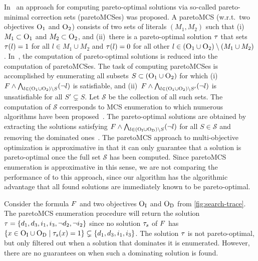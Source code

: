 In~\textcite{DBLP:conf/ijcai/Terra-NevesLM18a,DBLP:conf/aaai/Terra-NevesLM18,DBLP:conf/ijcai/Terra-NevesLM18} an approach for computing pareto-optimal solutions via so-called pareto-minimal correction sets (paretoMCSes) was proposed.
A paretoMCS (w.r.t.\ two objectives $\textsc{O}_1$ and $\textsc{O}_2$) consists of two sets of literals $(M_1, M_2)$ such that (i)~$M_1 \subset \textsc{O}_1$ and $M_2 \subset \textsc{O}_2$, and (ii)~there is a pareto-optimal solution $\tau$ that sets $\tau(l) = 1$ for all $l \in M_1 \cup M_2$ and $\tau(l) = 0$ for all other $l \in (\textsc{O}_1 \cup \textsc{O}_2) \setminus (M_1 \cup M_2)$.
In~\textcite{DBLP:conf/ijcai/Terra-NevesLM18a}, the computation of pareto-optimal solutions is reduced into the computation of paretoMCSes.
The task of computing paretoMCSes is accomplished by enumerating all subsets $S \subset  (\textsc{O}_1 \cup \textsc{O}_2)$ for which (i)~$F \land \bigwedge_{l \in  (\textsc{O}_1 \cup \textsc{O}_2) \setminus S} (\lnot l)$ is satisfiable, and (ii)~$F \land \bigwedge_{l \in  (\textsc{O}_1 \cup \textsc{O}_2) \setminus S'} (\lnot l)$ is unsatisfiable for all $S' \subsetneq S$.
Let $\mathcal{S}$ be the collection of all such sets.
The computation of $\mathcal{S}$ corresponds to MCS enumeration to which numerous algorithms have been proposed~\autocite{DBLP:conf/lpar/BendikC20,DBLP:conf/hvc/MorgadoLM12,DBLP:conf/sat/PrevitiMJM17}.
The pareto-optimal solutions are obtained by extracting the solutions satisfying $F \land \bigwedge_{l \in  (\textsc{O}_{\text{I}} \cup \textsc{O}_{\text{D}}) \setminus S} (\lnot l)$ for all $S \in \mathcal{S}$ and removing the dominated ones~\autocite{DBLP:conf/ijcai/Terra-NevesLM18a}.
The paretoMCS approach to multi-objective optimization is approximative in that it can only guarantee that a solution is pareto-optimal once the full set $\mathcal{S}$ has been computed.
Since paretoMCS enumeration is approximative in this sense, we are not comparing the performance of \algname{} to this approach, since our algorithm has the algorithmic advantage that all found solutions are immediately known to be pareto-optimal.

\begin{example}\label{ex:MCS}
  Consider the formula $F$ and two objectives $\textsc{O}_{\text{I}}$ and $\textsc{O}_{\text{D}}$ from \cref{fig:search-trace}.
  The paretoMCS enumeration procedure will return the solution $\tau = \{d_1, d_3, i_1, i_3, \lnot d_2, \lnot i_2\}$ since no solution $\tau_s$ of $F$ has $\{x \in \textsc{O}_{\text{I}} \cup \textsc{O}_{\text{D}} \mid  \tau_s(x) = 1\} \subsetneq \{d_1, d_3, i_1, i_3\}$.
  The solution $\tau$ is not pareto-optimal, but only filtered out when a solution that dominates it is enumerated.
  However, there are no guarantees on when such a dominating solution is found. 
\end{example}

